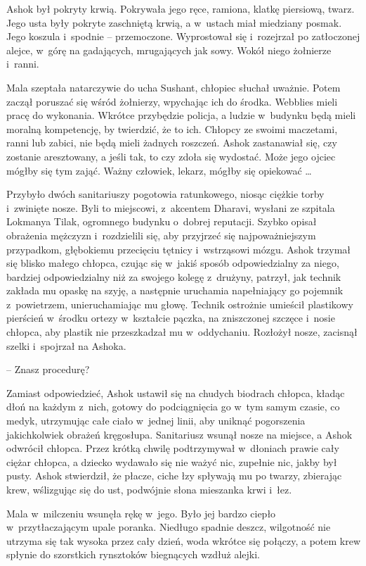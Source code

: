 \documentclass[oneside,polish,11pt,rmheadings]{mwbk}
\begin{document}
Ashok był pokryty krwią. Pokrywała jego ręce, ramiona, klatkę piersiową, twarz. Jego usta były pokryte zaschniętą krwią, a w~ustach miał miedziany posmak. Jego koszula i~spodnie -- przemoczone. Wyprostował się i~rozejrzał po zatłoczonej alejce, w~górę na gadających, mrugających jak sowy. Wokół niego żołnierze i~ranni.

Mala szeptała natarczywie do ucha Sushant, chłopiec słuchał uważnie. Potem zaczął poruszać się wśród żołnierzy, wpychając ich do środka. Webblies mieli pracę do wykonania. Wkrótce przybędzie policja, a ludzie w~budynku będą mieli moralną kompetencję, by twierdzić, że to ich. Chłopcy ze swoimi maczetami, ranni lub zabici, nie będą mieli żadnych roszczeń. Ashok zastanawiał się, czy zostanie aresztowany, a jeśli tak, to czy zdoła się wydostać. Może jego ojciec mógłby się tym zająć. Ważny człowiek, lekarz, mógłby się opiekować \ldots 

Przybyło dwóch sanitariuszy pogotowia ratunkowego, niosąc ciężkie torby i~zwinięte nosze. Byli to miejscowi, z~akcentem Dharavi, wysłani ze szpitala Lokmanya Tilak, ogromnego budynku o~dobrej reputacji. Szybko opisał obrażenia mężczyzn i~rozdzielili się, aby przyjrzeć się najpoważniejszym przypadkom, głębokiemu przecięciu tętnicy i~wstrząsowi mózgu. Ashok trzymał się blisko małego chłopca, czując się w~jakiś sposób odpowiedzialny za niego, bardziej odpowiedzialny niż za swojego kolegę z~drużyny, patrzył, jak technik zakłada mu opaskę na szyję, a następnie uruchamia napełniający go pojemnik z~powietrzem, unieruchamiając mu głowę. Technik ostrożnie umieścił plastikowy pierścień w~środku ortezy w~kształcie pączka, na zniszczonej szczęce i~nosie chłopca, aby plastik nie przeszkadzał mu w~oddychaniu. Rozłożył nosze, zacisnął szelki i~spojrzał na Ashoka.

-- Znasz procedurę?

Zamiast odpowiedzieć, Ashok ustawił się na chudych biodrach chłopca, kładąc dłoń na każdym z~nich, gotowy do podciągnięcia go w~tym samym czasie, co medyk, utrzymując całe ciało w~jednej linii, aby uniknąć pogorszenia jakichkolwiek obrażeń kręgosłupa. Sanitariusz wsunął nosze na miejsce, a Ashok odwrócił chłopca. Przez krótką chwilę podtrzymywał w~dłoniach prawie cały ciężar chłopca, a dziecko wydawało się nie ważyć nic, zupełnie nic, jakby był pusty. Ashok stwierdził, że płacze, ciche łzy spływają mu po twarzy, zbierając krew, wślizgując się do ust, podwójnie słona mieszanka krwi i~łez.

Mala w~milczeniu wsunęła rękę w~jego. Było jej bardzo ciepło w~przytłaczającym upale poranka. Niedługo spadnie deszcz, wilgotność nie utrzyma się tak wysoka przez cały dzień, woda wkrótce się połączy, a potem krew spłynie do szorstkich rynsztoków biegnących wzdłuż alejki.
\end{document}
